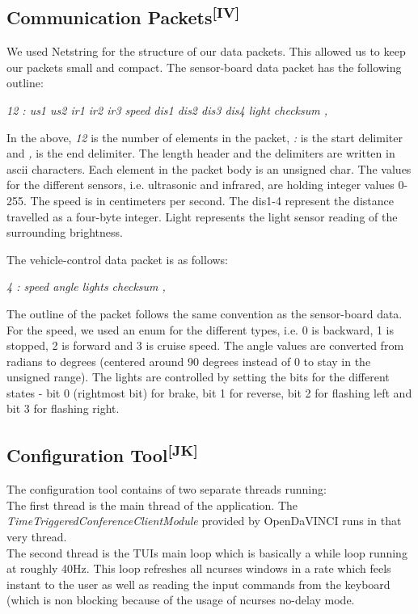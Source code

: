 \subsection[Communication Packets]{Communication Packets\textsuperscript{[IV]}}
We used Netstring for the structure of our data packets. This allowed us to keep
our packets small and compact. The sensor-board data packet has the following
outline:
\begin{center}
\textit{12 : us1 us2 ir1 ir2 ir3 speed dis1 dis2 dis3 dis4 light checksum ,}
\end{center}
In the above, \textit{12} is the number of elements in the packet, \textit{:}
is the start delimiter and \textit{,} is the end delimiter. The length header
and the delimiters are written in ascii characters. Each element in the packet
body is an unsigned char. The values for the different sensors, i.e. ultrasonic
and infrared, are holding integer values 0-255. The speed is in centimeters per
second. The dis1-4 represent the distance travelled as a four-byte integer.
Light represents the light sensor reading of the surrounding brightness.

\newpage
\noindent
The vehicle-control data packet is as follows:
\begin{center}
\textit{4 : speed angle lights checksum ,}
\end{center}
The outline of the packet follows the same convention as the sensor-board data.
For the speed, we used an enum for the different types, i.e. 0 is backward, 1 is
stopped, 2 is forward and 3 is cruise speed. The angle values are converted from
radians to degrees (centered around 90 degrees instead of 0 to stay in the
unsigned range). The lights are controlled by setting the bits for the different
states - bit 0 (rightmost bit) for brake, bit 1 for reverse, bit 2 for flashing
left and bit 3 for flashing right.

\subsection[Configuration Tool]{Configuration Tool\textsuperscript{[JK]}}
The configuration tool contains of two separate threads running:\\
The first thread is the main thread of the application. The
\textit{TimeTriggeredConferenceClientModule} provided by OpenDaVINCI runs in
that very thread.\\
The second thread is the TUIs main loop which is basically a while loop running
at roughly 40Hz. This loop refreshes all ncurses windows in a rate which feels
instant to the user as well as reading the input commands from the keyboard
(which is non blocking because of the usage of ncurses no-delay mode.\\

